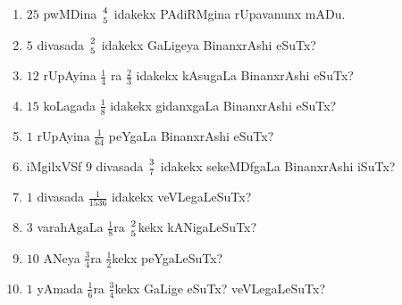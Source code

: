 \begin{enumerate}[\rm(1)]
\item $25$ pwMDina ${4} \above 0pt {5}$ idakekx PAdiRMgina rUpavanunx mADu.
\item $5$ divasada ${2} \above 0pt {5}$ idakekx GaLigeya BinanxrAshi eSuTx?

\item $12$ rUpAyina $\frac{1}{4}$ ra $\frac{2}{3}$ idakekx kAsugaLa BinanxrAshi eSuTx?

\item $15$ koLagada $\frac{1}{8}$ idakekx gidanxgaLa BinanxrAshi eSuTx?

\item $1$ rUpAyina $\frac{1}{64}$ peYgaLa BinanxrAshi eSuTx?

\item iMgilxVSf $9$ divasada ${3} \above 0pt {7}$ idakekx sekeMDfgaLa BinanxrAshi iSuTx?

\item $1$ divasada $\frac{1}{1536}$ idakekx veVLegaLeSuTx?

\item $3$ varahAgaLa $\frac{1}{8}$ra ${2} \above 0pt {5}$kekx kANigaLeSuTx?

\item $10$ ANeya $\frac{3}{4}$ra $\frac{1}{2}$kekx peYgaLeSuTx?

\item $1$ yAmada $\frac{1}{6}$ra $\frac{3}{4}$kekx GaLige eSuTx? veVLegaLeSuTx?
\end{enumerate}
